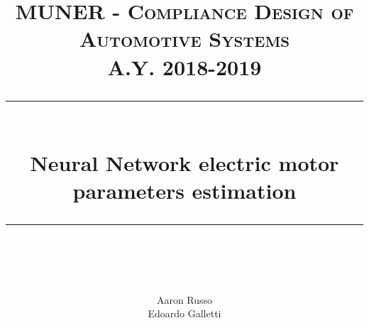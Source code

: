 % 
%
%
%





\newcommand{\horrule}[1]{\rule{\linewidth}{#1}} %

\title{	
\normalfont \normalsize 
\textsc{MUNER - Compliance Design of Automotive Systems} \\
\textsc{A.Y. 2018-2019} \\ [25pt]
\horrule{0.5pt} \\[0.4cm] %
\LARGE Neural Network electric motor parameters estimation \\ %
\horrule{2pt} \\[0.5cm] %
\date{}
}

\author{Aaron Russo \\ Edoardo Galletti} %



\maketitle %

\thispagestyle{empty}


\newpage
\thispagestyle{empty}

\tableofcontents{}


